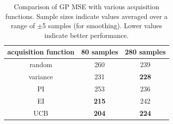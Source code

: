 \documentclass{sig-alternate}
\begin{document}
\begin{table}[tb]
\caption{Comparison of GP MSE with various acquisition functions. 
Sample sizes indicate values averaged over a range of $\pm$5 samples (for smoothing).
Lower values indicate better performance.}
\centering
\begin{tabular}{|c|c|c|}
\hline
acquisition function & 80 samples   & 280 samples  \\ \hline
random               & 260          & 239          \\ \hline
variance             & 231          & \textbf{228} \\ \hline
PI                   & 253          & 236          \\ \hline
EI                   & \textbf{215} & 242          \\ \hline
UCB                  & \textbf{204} & \textbf{224} \\ \hline
\end{tabular}
\label{tab:reg_res}
\end{table}
\end{document}
